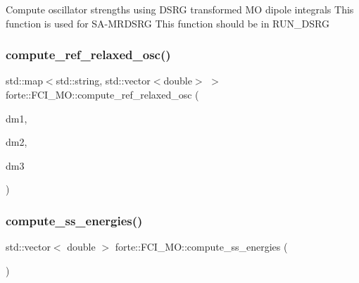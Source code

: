 Compute oscillator strengths using D\+S\+RG transformed MO dipole integrals This function is used for S\+A-\/\+M\+R\+D\+S\+RG This function should be in R\+U\+N\+\_\+\+D\+S\+RG \mbox{\label{classforte_1_1_f_c_i___m_o_ac474ed13c5324ddf29dc49422a0d321c}} 
\subsubsection{\texorpdfstring{compute\+\_\+ref\+\_\+relaxed\+\_\+osc()}{compute\_ref\_relaxed\_osc()}\hspace{0.1cm}{\footnotesize\ttfamily [2/2]}}
{\footnotesize\ttfamily std\+::map$<$std\+::string, std\+::vector$<$double$>$ $>$ forte\+::\+F\+C\+I\+\_\+\+M\+O\+::compute\+\_\+ref\+\_\+relaxed\+\_\+osc (\begin{DoxyParamCaption}\item[{std\+::vector$<$ ambit\+::\+Blocked\+Tensor $>$ \&}]{dm1,  }\item[{std\+::vector$<$ ambit\+::\+Blocked\+Tensor $>$ \&}]{dm2,  }\item[{std\+::vector$<$ ambit\+::\+Blocked\+Tensor $>$ \&}]{dm3 }\end{DoxyParamCaption})}

\mbox{\label{classforte_1_1_f_c_i___m_o_adaced1e93bf721e57e828eb612bfdb29}} 
\subsubsection{\texorpdfstring{compute\+\_\+ss\+\_\+energies()}{compute\_ss\_energies()}}
{\footnotesize\ttfamily std\+::vector$<$ double $>$ forte\+::\+F\+C\+I\+\_\+\+M\+O\+::compute\+\_\+ss\+\_\+energies (\begin{DoxyParamCaption}{ }\end{DoxyParamCaption})}



